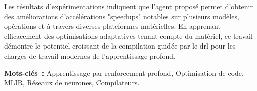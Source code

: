 \documentclass[12pt,a4paper]{report}
\begin{document}
Les résultats d'expérimentations indiquent que l'agent proposé permet d'obtenir des améliorations d'accélérations "speedups" notables sur plusieurs modèles, opérations et à travers diverses plateformes matérielles. En apprenant efficacement des optimisations adaptatives tenant compte du matériel, ce travail démontre le potentiel croissant de la compilation guidée par le \gls{drl} pour les charges de travail modernes de l'apprentissage profond.

\vspace{0.5cm}
\noindent \textbf{Mots-clés~:} Apprentissage par renforcement profond, Optimisation de code, MLIR, Réseaux de neurones, Compilateurs.

\newpage
{}
\tableofcontents

\newpage
{}
\listoftables

\newpage
{}
\listoffigures

\newpage
\printglossary[type=\acronymtype,title={List of Acronyms}]


\clearpage 
{}
\fancyhf{}
\fancyhead[L]{\leftmark}
\fancyhead[R]{}
\fancyfoot[C]{\thepage}










\clearpage 
{}      %
\setcounter{page}{11}     %
\printbibliography[heading=bibintoc,title={Bibliography}]
\end{document}
